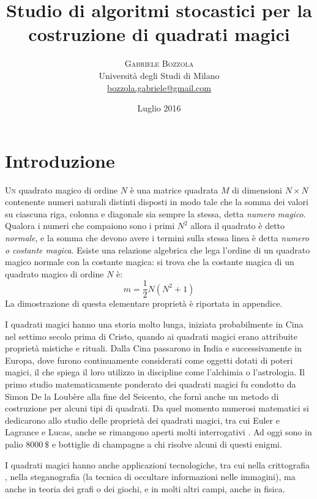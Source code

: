 \documentclass[italian,twoside,twocolumn]{article}
\title{Studio di algoritmi stocastici per la costruzione di quadrati magici} %
\author{%
\textsc{Gabriele Bozzola} \\[1ex] %
\normalsize Università degli Studi di Milano \\ %
\normalsize \href{mailto:bozzola.gabriele@gmail.com}{bozzola.gabriele@gmail.com} %
}
\date{Luglio 2016} %
\begin{document}
\maketitle


\section{Introduzione}

\lettrine[nindent=0em,lines=3]{U}n quadrato magico di ordine $ N $ è una matrice quadrata  $ M $  di dimensioni $ N\times N $ contenente numeri naturali distinti disposti in modo tale che la somma dei valori su ciascuna riga, colonna e diagonale sia sempre la stessa, detta \emph{numero magico}. Qualora i numeri che compaiono sono i primi $ N^2 $ allora il quadrato è detto \emph{normale}, e la somma che devono avere i termini sulla stessa linea è detta \emph{numero o costante magica}. Esiste una relazione algebrica che lega l'ordine di un quadrato magico normale con la costante magica: si trova che la costante magica di un quadrato magico di ordine $ N $ è:
\[	 \mathit{m} = \frac{1}{2} N (N^2 + 1)	\]
La dimostrazione di questa elementare proprietà è riportata in appendice.

I quadrati magici hanno una storia molto lunga, iniziata probabilmente in Cina nel settimo secolo prima di Cristo, quando ai quadrati magici erano attribuite proprietà mistiche e rituali. Dalla Cina passarono in India e successivamente in Europa, dove furono continuamente considerati come oggetti dotati di poteri magici, il che spiega il loro utilizzo in discipline come l'alchimia o l'astrologia. Il primo studio matematicamente ponderato dei quadrati magici fu condotto da Simon De la Loubère alla fine del Seicento, che fornì anche un metodo di costruzione per alcuni tipi di quadrati. Da quel momento numerosi matematici si dedicarono allo studio delle proprietà dei quadrati magici, tra cui Euler e Lagrance e Lucas, anche se rimangono aperti molti interrogativi \cite{Abe:1994}. Ad oggi sono in palio $ \SI{8000}{\$} $ e bottiglie di champagne a chi risolve alcuni di questi enigmi. 

I quadrati magici hanno anche applicazioni tecnologiche, tra cui nella crittografia \cite{TombaShiniraj:2014}, nella steganografia \cite{SahaBha:2015} (la tecnica di occultare informazioni nelle immagini), ma anche in teoria dei grafi o dei giochi, e in molti altri campi, anche in fisica.
\end{document}
